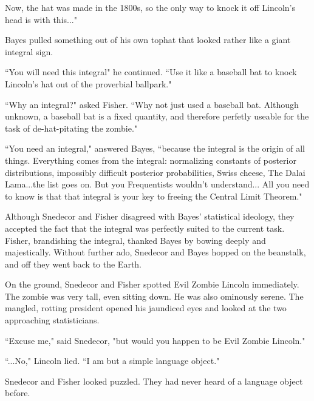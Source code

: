 \documentclass{article}
\begin{document}
Now, the hat was made in the 1800s, so the only way to knock it off Lincoln's head is with this..." \newline

Bayes pulled something out of his own tophat that looked rather like a giant integral sign. \newline

``You will need this integral" he continued. ``Use it like a baseball bat to knock Lincoln's hat out of the proverbial ballpark." \newline

``Why an integral?" asked Fisher. ``Why not just used a baseball bat. Although unknown, a baseball bat is a fixed quantity, and therefore perfetly useable for the task of de-hat-pitating the zombie." \newline

``You need an integral," answered Bayes, ``because the integral is the origin of all things. Everything comes from the integral: normalizing constants of posterior distributions, impossibly difficult posterior probabilities, Swiss cheese, The Dalai Lama...the list goes on. But you Frequentists wouldn't understand... All you need to know is that that integral is your key to freeing the Central Limit Theorem." \newline

Although Snedecor and Fisher disagreed with Bayes' statistical ideology, they accepted the fact that the integral was perfectly suited to the current task. Fisher, brandishing the integral, thanked Bayes by bowing deeply and majestically. Without further ado, Snedecor and Bayes hopped on the beanstalk, and off they went back to the Earth. \newline \newline


On the ground, Snedecor and Fisher spotted Evil Zombie Lincoln immediately. The zombie was very tall, even sitting down. He was also ominously serene. The mangled, rotting president opened his jaundiced eyes and looked at the two approaching statisticians. \newline

``Excuse me," said Snedecor, "but would you happen to be Evil Zombie Lincoln." \newline

``...No," Lincoln lied. ``I am but a simple language object." \newline

Snedecor and Fisher looked puzzled. They had never heard of a language object before. \newline
\end{document}
